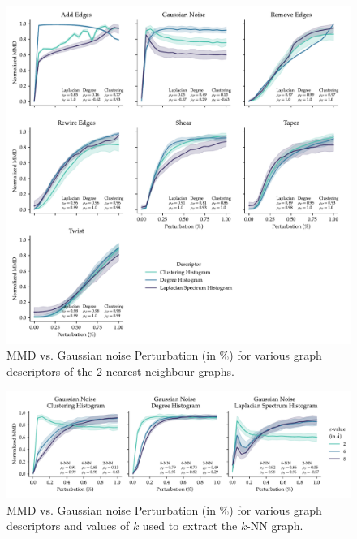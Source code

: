 \begin{figure}
  \centering
  \includegraphics[width=\textwidth]{./figures/results/res_1_3.pdf}
  \caption{MMD vs. Gaussian noise Perturbation (in \%) for various graph descriptors of the
    2-nearest-neighbour graphs.}
  \label{fig:mmd_k_nn_graphs}
\end{figure}

\begin{figure}
  \includegraphics[width=\textwidth]{./figures/results/res_1_4.pdf}
  \caption{MMD vs. Gaussian noise Perturbation (in \%) for various graph
    descriptors and values of $k$ used to extract the $k$-NN graph.}
  \label{fig:k_vs_turbulence_gaussian_noise}

\end{figure}


